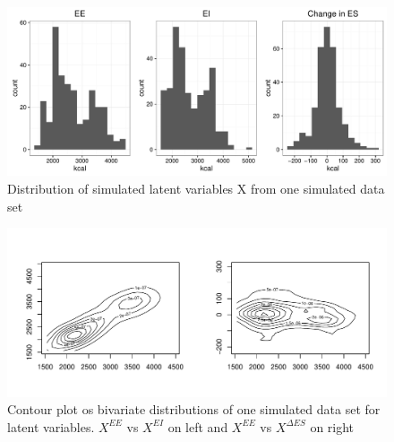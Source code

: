 \documentclass[11pt]{article}\usepackage[]{graphicx}\usepackage[]{color}
\makeatletter
\def\maxwidth{ %
  \ifdim\Gin@nat@width>\linewidth
    \linewidth
  \else
    \Gin@nat@width
  \fi
}
\newenvironment{knitrout}{}{} %
\makeatother
\begin{document}
\begin{knitrout}
\color{fgcolor}\begin{figure}
\includegraphics[width=\maxwidth]{figure/latentx-1} \caption[Distribution of simulated latent variables X from one simulated data set]{Distribution of simulated latent variables X from one simulated data set}\label{fig:latentx}
\end{figure}


\end{knitrout}


\begin{knitrout}
\color{fgcolor}\begin{figure}
\includegraphics[width=\maxwidth]{figure/contourx-1} \caption[Contour plot os bivariate distributions of one simulated data set for latent variables]{Contour plot os bivariate distributions of one simulated data set for latent variables. $X^{EE}$ vs $X^{EI}$ on left and $X^{EE}$ vs $X^{\Delta ES}$ on right}\label{fig:contourx}
\end{figure}


\end{knitrout}

\end{document}

